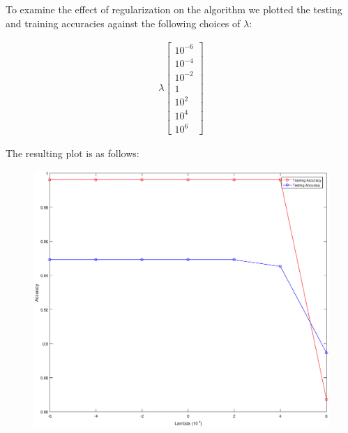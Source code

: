 \documentclass{article}
\begin{document}
To examine the effect of regularization on the algorithm we plotted the testing and training accuracies against the following choices of $\lambda$:
	
	\begin{align}
		\lambda \begin{bmatrix}
		10^{-6} \\
		10^{-4} \\
		10^{-2} \\
		1 \\
		10^{2} \\
		10^{4} \\
		10^{6}
		\end{bmatrix} 
	\end{align}
	
The resulting plot is as follows:

	
	\begin{figure}[h!]
		\begin{center} 
			\includegraphics[scale=0.5]{lambda_accuracy.eps} 
		\end{center}  
		\label{fig:M3}
	\end{figure}
\newpage


	
	
\end{document}
